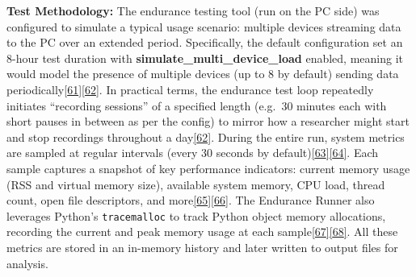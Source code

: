 \documentclass[12pt,a4paper]{article}
\begin{document}
\textbf{Test Methodology:} The endurance testing tool (run on the PC side) was configured to simulate a typical usage scenario: multiple devices streaming data to the PC over an extended period. Specifically, the default configuration set an 8-hour test duration with \textbf{simulate\_multi\_device\_load} enabled, meaning it would model the presence of multiple devices (up to 8 by default) sending data periodically\href{https://github.com/buccancs/bucika_gsr/blob/7048f7f6a7536f5cd577ed2184800d3dad97fd08/PythonApp/production/endurance_testing.py\#L52-L60}{{[}61{]}}\href{https://github.com/buccancs/bucika_gsr/blob/7048f7f6a7536f5cd577ed2184800d3dad97fd08/PythonApp/production/endurance_testing.py\#L54-L62}{{[}62{]}}. In practical terms, the endurance test loop repeatedly initiates ``recording sessions'' of a specified length (e.g.~30 minutes each with short pauses in between as per the config) to mirror how a researcher might start and stop recordings throughout a day\href{https://github.com/buccancs/bucika_gsr/blob/7048f7f6a7536f5cd577ed2184800d3dad97fd08/PythonApp/production/endurance_testing.py\#L54-L62}{{[}62{]}}. During the entire run, system metrics are sampled at regular intervals (every 30 seconds by default)\href{https://github.com/buccancs/bucika_gsr/blob/7048f7f6a7536f5cd577ed2184800d3dad97fd08/PythonApp/production/endurance_testing.py\#L38-L46}{{[}63{]}}\href{https://github.com/buccancs/bucika_gsr/blob/7048f7f6a7536f5cd577ed2184800d3dad97fd08/PythonApp/production/endurance_testing.py\#L315-L324}{{[}64{]}}. Each sample captures a snapshot of key performance indicators: current memory usage (RSS and virtual memory size), available system memory, CPU load, thread count, open file descriptors, and more\href{https://github.com/buccancs/bucika_gsr/blob/7048f7f6a7536f5cd577ed2184800d3dad97fd08/PythonApp/production/endurance_testing.py\#L359-L368}{{[}65{]}}\href{https://github.com/buccancs/bucika_gsr/blob/7048f7f6a7536f5cd577ed2184800d3dad97fd08/PythonApp/production/endurance_testing.py\#L398-L406}{{[}66{]}}. The Endurance Runner also leverages Python's \passthrough{\lstinline!tracemalloc!} to track Python object memory allocations, recording the current and peak memory usage at each sample\href{https://github.com/buccancs/bucika_gsr/blob/7048f7f6a7536f5cd577ed2184800d3dad97fd08/PythonApp/production/endurance_testing.py\#L368-L377}{{[}67{]}}\href{https://github.com/buccancs/bucika_gsr/blob/7048f7f6a7536f5cd577ed2184800d3dad97fd08/PythonApp/production/endurance_testing.py\#L374-L382}{{[}68{]}}. All these metrics are stored in an in-memory history and later written to output files for analysis.
\end{document}

